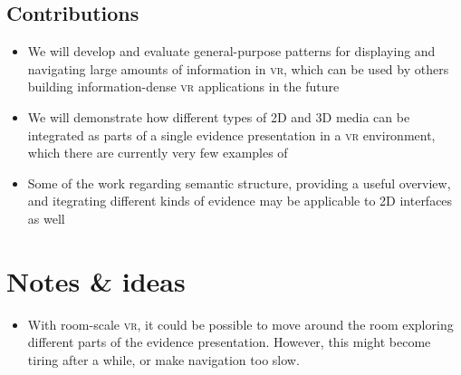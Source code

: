 \subsection{Contributions}
\begin{itemize}
  \setlength\itemsep{.1em}
  \item We will develop and evaluate general-purpose patterns for displaying and navigating large amounts of information in \textsc{vr}, which can be used by others building information-dense \textsc{vr} applications in the future
	\item We will demonstrate how different types of 2D and 3D media can be integrated as parts of a single evidence presentation in a \textsc{vr} environment, which there are currently very few examples of
  \item Some of the work regarding semantic structure, providing a useful overview, and itegrating different kinds of evidence may be applicable to 2D interfaces as well
\end{itemize}


\section{Notes \& ideas}
\begin{itemize}
  \setlength\itemsep{.1em}
	\item With room-scale \textsc{vr}, it could be possible to move around the room exploring different parts of the evidence presentation. However, this might become tiring after a while, or make navigation too slow.
\end{itemize}





